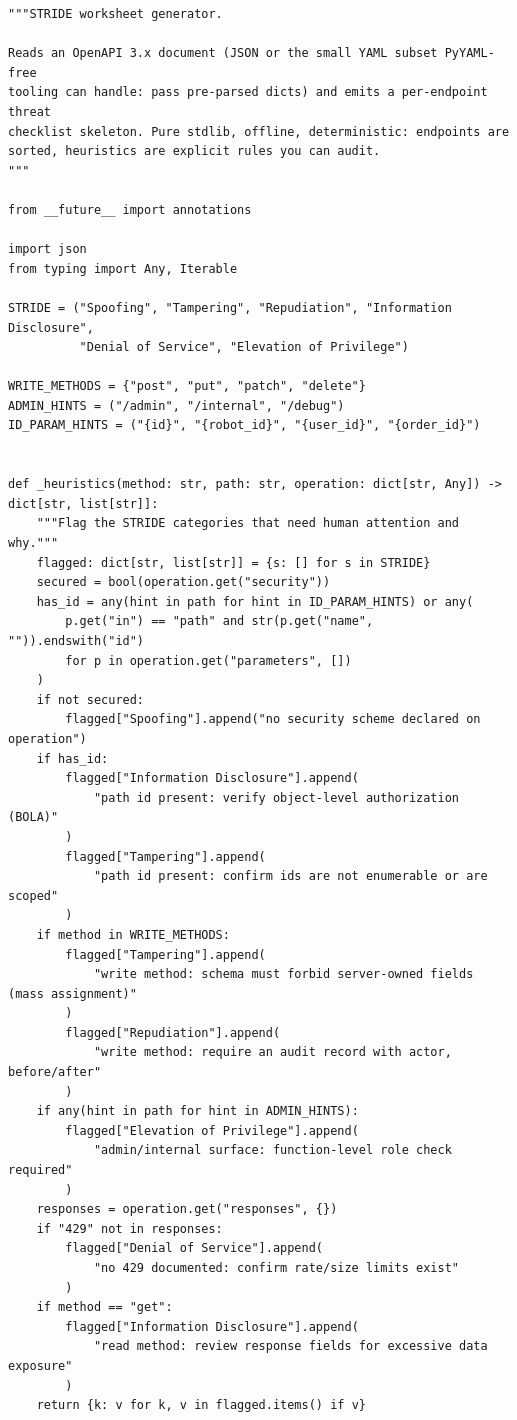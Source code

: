 \begin{verbatim}
"""STRIDE worksheet generator.

Reads an OpenAPI 3.x document (JSON or the small YAML subset PyYAML-free
tooling can handle: pass pre-parsed dicts) and emits a per-endpoint threat
checklist skeleton. Pure stdlib, offline, deterministic: endpoints are
sorted, heuristics are explicit rules you can audit.
"""

from __future__ import annotations

import json
from typing import Any, Iterable

STRIDE = ("Spoofing", "Tampering", "Repudiation", "Information Disclosure",
          "Denial of Service", "Elevation of Privilege")

WRITE_METHODS = {"post", "put", "patch", "delete"}
ADMIN_HINTS = ("/admin", "/internal", "/debug")
ID_PARAM_HINTS = ("{id}", "{robot_id}", "{user_id}", "{order_id}")


def _heuristics(method: str, path: str, operation: dict[str, Any]) -> dict[str, list[str]]:
    """Flag the STRIDE categories that need human attention and why."""
    flagged: dict[str, list[str]] = {s: [] for s in STRIDE}
    secured = bool(operation.get("security"))
    has_id = any(hint in path for hint in ID_PARAM_HINTS) or any(
        p.get("in") == "path" and str(p.get("name", "")).endswith("id")
        for p in operation.get("parameters", [])
    )
    if not secured:
        flagged["Spoofing"].append("no security scheme declared on operation")
    if has_id:
        flagged["Information Disclosure"].append(
            "path id present: verify object-level authorization (BOLA)"
        )
        flagged["Tampering"].append(
            "path id present: confirm ids are not enumerable or are scoped"
        )
    if method in WRITE_METHODS:
        flagged["Tampering"].append(
            "write method: schema must forbid server-owned fields (mass assignment)"
        )
        flagged["Repudiation"].append(
            "write method: require an audit record with actor, before/after"
        )
    if any(hint in path for hint in ADMIN_HINTS):
        flagged["Elevation of Privilege"].append(
            "admin/internal surface: function-level role check required"
        )
    responses = operation.get("responses", {})
    if "429" not in responses:
        flagged["Denial of Service"].append(
            "no 429 documented: confirm rate/size limits exist"
        )
    if method == "get":
        flagged["Information Disclosure"].append(
            "read method: review response fields for excessive data exposure"
        )
    return {k: v for k, v in flagged.items() if v}



\end{verbatim}
